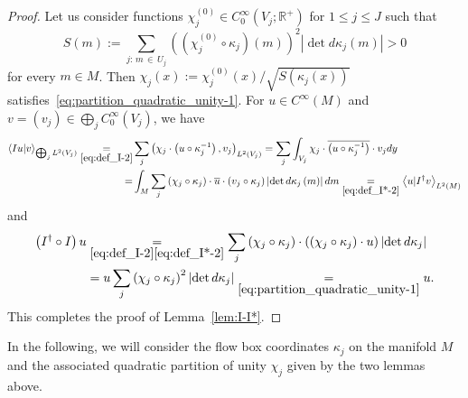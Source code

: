 \documentclass[AHL,Unicode,longabstracts,published]{cedram}
\newcommand{\bbR}{\mathbb{R}}
\newcommand{\bbR}{\mathbb{R}}
\begin{document}
\begin{proof}
Let us consider functions $\chi_{j}^{(0)}\in C_{0}^{\infty}(V_{j};\bbR^{+})$ for $1\leq j\leq J$ such that
\[
S\left(m\right):=\sum_{j:\,m\,\in\,U_{j}}\left(\left(\chi_{j}^{\left(0\right)}\circ\kappa_{j}\right)\left(m\right)\right)^{2}\left|\det d\kappa_{j}\left(m\right)\right|>0
\]
for every $m\in M$. Then $\chi_{j}(x):=\chi_{j}^{(0)}(x)/\sqrt{S(\kappa_{j}(x))}$ satisfies~\eqref{eq:partition_quadratic_unity-1}. For $u\in C^{\infty}(M)$ and $v=(v_{j})\in\bigoplus_{j}C_{0}^{\infty}(V_{j})$, we have
\begin{align*}
\left\langle Iu|v\right\rangle _{\bigoplus_{j}L^{2}\left(V_{j}\right)} \underset{\eqref{eq:def_I-2}}{=}& \sum_{j}\left(\chi_{j}\cdot\left(u\circ\kappa_{j}^{-1}\right),v_{j}\right)_{L^{2}\left(V_{j}\right)}=\sum_{j}\int_{V_{j}}\chi_{j}\cdot\overline{\left(u\circ\kappa_{j}^{-1}\right)}\cdot v_{j}dy\\
 =& \int_{M}\sum_{j}\left(\chi_{j}\circ\kappa_{j}\right)\cdot\overline{u}\cdot\left(v_{j}\circ\kappa_{j}\right)\left|\det d\kappa_{j}\left(m\right)\right|dm\underset{\eqref{eq:def_I*-2}}{=}\left\langle u|I^{\dagger}v\right\rangle _{L^{2}\left(M\right)}
\end{align*}
and
\begin{align*}
\left(I^{\dagger}\circ I\right)u & \underset{\eqref{eq:def_I-2}\eqref{eq:def_I*-2}}{=}\sum_{j}\left(\chi_{j}\circ\kappa_{j}\right)\cdot\left(\left(\chi_{j}\circ\kappa_{j}\right)\cdot u\right)\left|\det d\kappa_{j}\right|\\
& =u\sum_{j}\left(\chi_{j}\circ\kappa_{j}\right)^{2}\left|\det d\kappa_{j}\right|\underset{\eqref{eq:partition_quadratic_unity-1}}{=}u.
\end{align*}
This completes the proof of Lemma~\ref{lem:I-I*}.
\end{proof}

In the following, we will consider the flow box coordinates $\kappa_{j}$ on the manifold $M$ and the associated quadratic partition of unity $\chi_{j}$ given by the two lemmas above.
\end{document}

